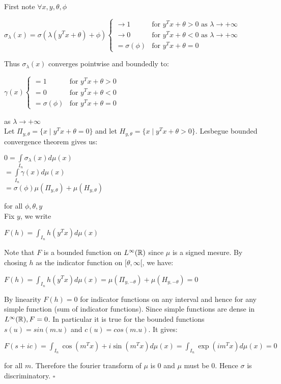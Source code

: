 \documentclass[12pt, a4paper]{article}
\newenvironment{proof}{{\sc Proof:}}{\hfill $\square$}
\begin{document}
  \begin{proof}
    First note $\forall x,y,\theta, \phi$ 
\begin{center}
  $\sigma_\lambda(x) = \sigma(\lambda (y^Tx + \theta) + \phi)
  \begin{cases}
    \to 1 &\text{for $y^Tx+\theta > 0$ as $\lambda \to +\infty$}\\
    \to 0 &\text{for $y^Tx+\theta < 0$ as $\lambda \to +\infty$}\\
    =\sigma(\phi) & \text{for $y^Tx+\theta = 0$}
  \end{cases}$
\end{center}
Thus $\sigma_\lambda(x)$ converges pointwise and boundedly to:

\begin{center}
  $\gamma(x)
  \begin{cases}
    =1 &\text{for $y^Tx+\theta > 0$}\\
    =0 &\text{for $y^Tx+\theta < 0$}\\
    =\sigma(\phi) & \text{for $y^Tx+\theta = 0$}
  \end{cases}$
\end{center}
as $\lambda \to +\infty$\\
\sv
Let $\Pi_{y,\theta} = \{x \mid y^Tx+\theta = 0\}$ and let $H_{y,\theta} = \{x \mid y^Tx + \theta > 0\}$. Lesbegue bounded convergence theorem gives us:
\begin{center}
  $0 = \int\limits_{I_n}\sigma_\lambda(x)d\mu(x)$\\
  $ = \int\limits_{I_n} \gamma(x)d\mu(x)$\\
  $= \sigma(\phi)\mu(\Pi_{y,\theta}) + \mu(H_{y,\theta})$
\end{center}
for all $\phi, \theta, y$\\
\sv
Fix $y$, we write
\begin{center}
  $F(h) = \int_{I_n}h(y^Tx)d\mu(x)$
\end{center}
Note that $F$ is a bounded function on $L^\infty(\mathbb{R})$ since $\mu$ is a signed mesure. By chosing  $h$ as the indicator function on $[\theta, \infty[$, we have:
\begin{center}
  $F(h) = \int_{I_n} h(y^Tx) d\mu(x) = \mu(\Pi_{y,-\theta}) + \mu(H_{y,-\theta}) = 0$
\end{center}
By linearity $F(h) = 0$ for indicator functions on any interval and hence for any simple function (sum of indicator functions). Since simple functions are dense in $L^{\infty}(\mathbb{R}), F = 0$.
In particular it is true for the bounded functions $s(u) = sin(m.u)$ and $c(u) = cos(m.u)$. It gives:
\begin{center}
  $F(s+ic) = \int_{I_n} \cos(m^Tx) + i \sin(m^Tx) d\mu(x) = \int_{I_n} \exp(im^Tx)d\mu(x) = 0$
\end{center}
for all $m$. Therefore the fourier transform of $\mu$ is 0 and $\mu$ must be 0. Hence $\sigma$ is discriminatory.
  \end{proof}\\
\end{document}
